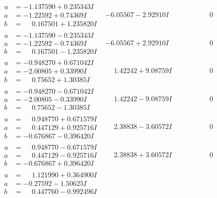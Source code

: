 \documentclass[1p]{elsarticle_modified}
\theoremstyle{definition}
\begin{document}
$$\begin{array}{c|c|c}
\begin{aligned}
u &= -1.137590 + 0.235343 I \\
a &= -1.22592 + 0.74369 I \\
b &= \phantom{-}0.167501 + 1.235820 I\end{aligned}
 & -6.05567 - 2.92910 I & \phantom{-0.000000 } 0 \\ \hline\begin{aligned}
u &= -1.137590 - 0.235343 I \\
a &= -1.22592 - 0.74369 I \\
b &= \phantom{-}0.167501 - 1.235820 I\end{aligned}
 & -6.05567 + 2.92910 I & \phantom{-0.000000 } 0 \\ \hline\begin{aligned}
u &= -0.948270 + 0.671042 I \\
a &= -2.00805 + 0.33990 I \\
b &= \phantom{-}0.75652 + 1.30385 I\end{aligned}
 & \phantom{-}1.42242 + 9.08759 I & \phantom{-0.000000 } 0 \\ \hline\begin{aligned}
u &= -0.948270 - 0.671042 I \\
a &= -2.00805 - 0.33990 I \\
b &= \phantom{-}0.75652 - 1.30385 I\end{aligned}
 & \phantom{-}1.42242 - 9.08759 I & \phantom{-0.000000 } 0 \\ \hline\begin{aligned}
u &= \phantom{-}0.948770 + 0.671579 I \\
a &= \phantom{-}0.447129 + 0.925716 I \\
b &= -0.676867 - 0.396420 I\end{aligned}
 & \phantom{-}2.38838 - 3.60572 I & \phantom{-0.000000 } 0 \\ \hline\begin{aligned}
u &= \phantom{-}0.948770 - 0.671579 I \\
a &= \phantom{-}0.447129 - 0.925716 I \\
b &= -0.676867 + 0.396420 I\end{aligned}
 & \phantom{-}2.38838 + 3.60572 I & \phantom{-0.000000 } 0 \\ \hline\begin{aligned}
u &= \phantom{-}1.121990 + 0.364900 I \\
a &= -0.27592 - 1.50625 I \\
b &= \phantom{-}0.447760 - 0.992496 I\end{aligned}

\end{array}$$
\end{document}

